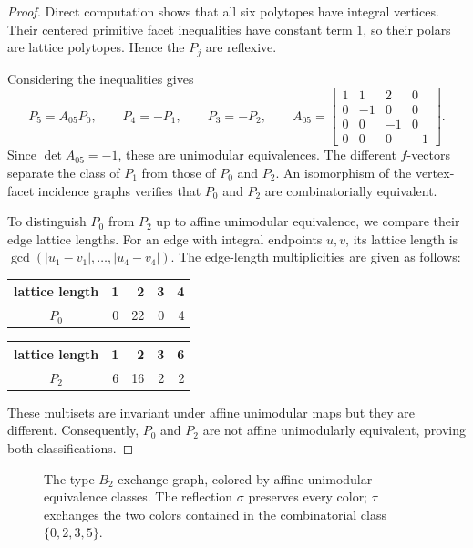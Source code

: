 \documentclass[10pt]{amsart}
\numberwithin{equation}{section}
\theoremstyle{plain}
\theoremstyle{definition}
\theoremstyle{remark}
\begin{document}
\begin{proof}
Direct computation shows that all six polytopes have integral vertices.
Their centered primitive facet inequalities have constant term $1$,
so their polars are lattice polytopes. Hence the $P_j$ are reflexive.
	
	Considering the
	inequalities gives
	\[
	P_5=A_{05}P_0,\qquad P_4=-P_1,\qquad P_3=-P_2,
	\qquad
	A_{05}=\begin{bmatrix}
		1&1&2&0\\
		0&-1&0&0\\
		0&0&-1&0\\
		0&0&0&-1
	\end{bmatrix}.
	\]
	Since $\det A_{05}=-1$, these are unimodular equivalences.
	The different $f$-vectors separate the class of $P_1$ from
	those of $P_0$ and $P_2$. An isomorphism of the vertex-facet
	incidence graphs verifies that $P_0$ and $P_2$ are
	combinatorially equivalent.
	
	To distinguish $P_0$ from $P_2$ up to affine unimodular equivalence,
	we compare their edge lattice lengths.
	For an edge with integral endpoints $u,v$, its lattice length is
	$\gcd(|u_1-v_1|,\ldots,|u_4-v_4|)$.
	The edge-length multiplicities are given as follows: 
	\begin{center}
	\begin{tabular}{c|rrrr} 
				lattice length&1&2&3&4\\\midrule 
		$P_0$&0&22&0&4
\end{tabular}
\qquad 
\begin{tabular}{c|rrrr}
		lattice length&1&2&3&6\\\midrule 
$P_2$&6&16&2&2
\end{tabular}
	\end{center}
	These multisets are invariant under affine unimodular maps
	but they are different. Consequently, $P_0$ and $P_2$ are not
	affine unimodularly equivalent, proving both classifications.
\end{proof}
\begin{figure}
\caption{The type $B_2$ exchange graph, colored by affine
	unimodular equivalence classes.
	The reflection $\sigma$ preserves every color;
	$\tau$ exchanges the two colors contained in the
	combinatorial class $\{0,2,3,5\}$.}\label{fig_B2}
\end{figure}
\end{document}
